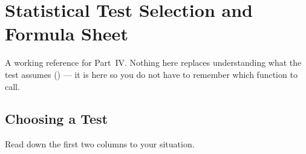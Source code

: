 \chapter{Statistical Test Selection and Formula Sheet}\label{app:stats}

A working reference for Part~IV. Nothing here replaces understanding what the
test assumes () --- it is here so you do not have to remember
which function to call.

\section{Choosing a Test}

Read down the first two columns to your situation.

